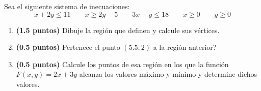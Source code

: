 
Sea el siguiente sistema de inecuaciones:
\[
x+2y\leq11\qquad x\geq2y-5\qquad3x+y\leq18\qquad x\geq0\qquad y\geq0
\]
\begin{enumerate}[label=\alph*)]
\item \textbf{(1.5 puntos)} Dibuje la región que definen y calcule sus vértices.
\item \textbf{(0.5 puntos)} \textquestiondown{}Pertenece el punto $(5.5,2)$ a la región anterior?
\item \textbf{(0.5 puntos)} Calcule los puntos de esa región en los que la función $F(x,y)=2x+3y$ alcanza los valores máximo y mínimo y determine dichos valores.
\end{enumerate}
